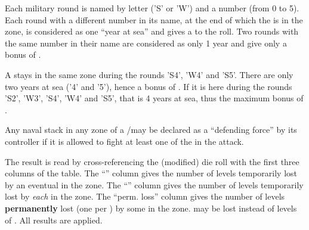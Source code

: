 \bparag Each military round is named by letter ('S' or 'W') and a number (from
0 to 5).
\bparag Each round with a different number in its name, at the end of which
the \corsaire is in the zone, is considered as one ``year at sea'' and gives a
 to the roll.
\bparag Two rounds with the same number in their name are considered as only 1
year and give only a bonus of .
\begin{exemple}
  A \corsaire stays in the same zone during the rounds 'S4', 'W4' and
  'S5'. There are only two years at sea ('4' and '5'), hence a bonus of
  . If it is here during the rounds 'S2', 'W3', 'S4', 'W4' and 'S5',
  that is 4 years at sea, thus the maximum bonus of .
\end{exemple}

 Any naval stack in any zone of a \STZ/\CTZ may
be declared as a ``defending force'' by its controller if it is allowed to
fight at least one of the \corsaire in the attack.


\bparag The result is read by cross-referencing the (modified) die roll with
the first three columns of the table.
\bparag The ``\TradeFLEET\faceplus'' column gives the number of levels
temporarily lost by an eventual \TradeFLEET\faceplus in the zone.
\bparag The ``\TradeFLEET\facemoins'' column gives the number of levels
temporarily lost by \emph{each} \TradeFLEET\facemoins in the zone.
\bparag The ``perm. loss'' column gives the number of levels
\textbf{permanently} lost (one per \textetoile) by some \TradeFLEET in the
zone.
\bparag \ND may be lost instead of levels of \TradeFLEET.
\bparag All results are applied.


